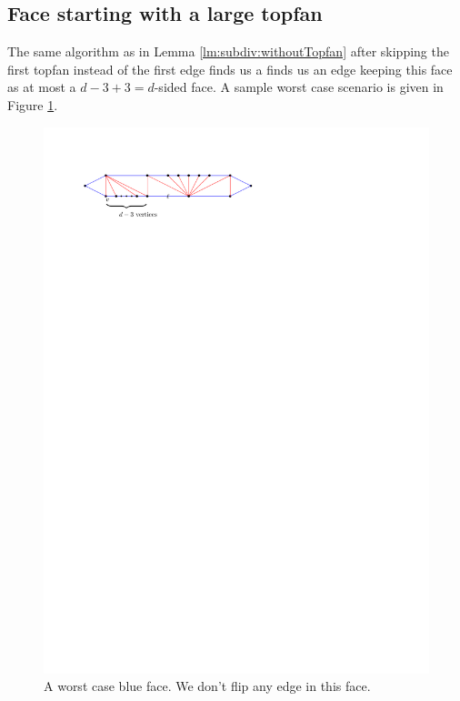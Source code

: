 \subsection{Face starting with a large topfan}
The same algorithm as in Lemma \ref{lm:subdiv:withoutTopfan} after skipping the first topfan instead of the first edge finds us a finds us an edge keeping this face as at most a $ d - 3 +3 = d$-sided face. A sample worst case scenario is given in Figure \ref{fig:subdiv:worstCaseWithTopFan}.

\begin{figure}[h]
  \centering
  \includegraphics[scale=1]{blueFaceSubdivision/img/worstCaseWithTopFan}
  \caption{A worst case blue face. We don't flip any edge in this face.}
  \label{fig:subdiv:worstCaseWithTopFan}
\end{figure}


